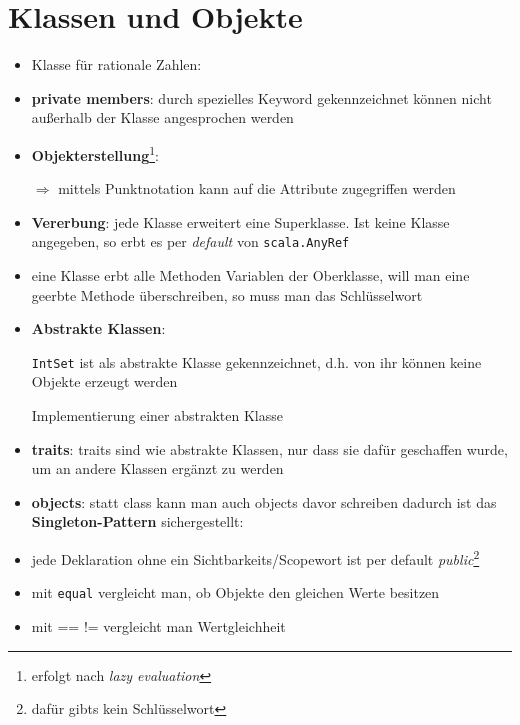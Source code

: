 \section{Klassen und Objekte}
\begin{itemize}
  \item Klasse für rationale Zahlen:
  
  
  
  \item \textbf{private members}: durch spezielles Keyword gekennzeichnet
  \und können nicht außerhalb der Klasse angesprochen werden
  \item \textbf{Objekterstellung}\footnote{erfolgt nach 
  \textit{lazy evaluation}}:
  
  
  
  
  $\Rightarrow$ mittels Punktnotation kann auf die Attribute zugegriffen
  werden
  \item \textbf{Vererbung}: jede Klasse erweitert eine Superklasse. Ist
  keine Klasse angegeben, so erbt es per \textit{default} von
  \texttt{scala.AnyRef}
  
  
  
  \item eine Klasse erbt alle Methoden \und Variablen der Oberklasse, will
  man eine geerbte Methode überschreiben, so muss man das Schlüsselwort    
  \item \textbf{Abstrakte Klassen}: 
  
  
  
  \texttt{IntSet} ist als abstrakte Klasse gekennzeichnet, d.h. von 
  ihr können keine Objekte erzeugt werden
  
  Implementierung einer abstrakten Klasse
  
  
  
  \item \textbf{traits}: traits sind wie abstrakte Klassen, nur 
  dass sie dafür geschaffen wurde, um an andere Klassen ergänzt zu
  werden
  
  
  \item \textbf{objects}: statt class kann man auch objects davor 
  schreiben
  \und dadurch ist das \textbf{Singleton-Pattern} sichergestellt:
  
  
  
  \item jede Deklaration ohne ein Sichtbarkeits/Scopewort ist per 
  default
  \textit{public}\footnote{dafür gibts kein Schlüsselwort}
  \item mit \texttt{equal} vergleicht man, ob Objekte den gleichen
  Werte besitzen
  \item mit == \und != vergleicht man Wertgleichheit
\end{itemize}



